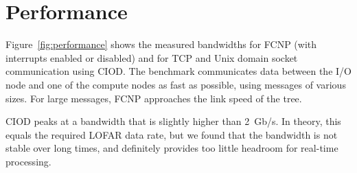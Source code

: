 \documentclass[journal]{IEEEtran}
\begin{document}



\section{Performance}
\label{sec:performance}

\begin{figure*}[t]
\hfill
{}
\caption{Measured bandwidths, as function of message size.}
\label{fig:performance}
\end{figure*}

Figure~\ref{fig:performance} shows the measured bandwidths for FCNP (with
interrupts enabled or disabled) and for TCP and Unix domain socket
communication using CIOD.
The benchmark communicates data between the I/O node and one of the compute
nodes as fast as possible, using messages of various sizes.
For large messages, FCNP approaches the link speed of the tree.

CIOD peaks at a bandwidth that is slightly higher than 2~Gb/s.
In theory, this equals the required LOFAR data rate, but we found that the
bandwidth is not stable over long times, and definitely provides too little
headroom for real-time processing.
\end{document}
